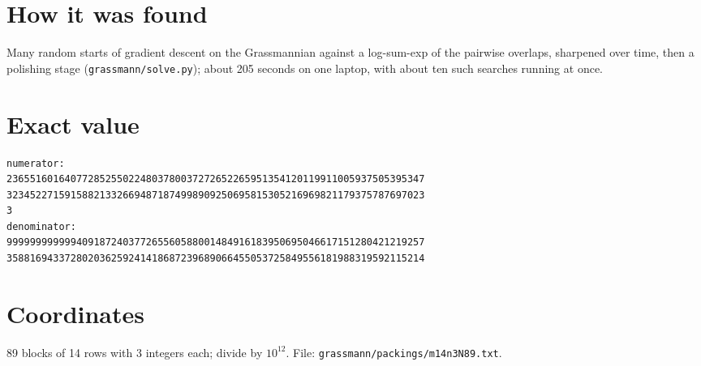 \documentclass[11pt,a4paper]{article}
\begin{document}
\section{How it was found}
Many random starts of gradient descent on the Grassmannian against a log-sum-exp of the pairwise overlaps, sharpened over time, then a polishing stage (\texttt{grassmann/solve.py}); about 205 seconds on one laptop, with about ten such searches running at once.


\appendix
\section{Exact value}
{\small
\begin{verbatim}
numerator:
236551601640772852550224803780037272652265951354120119911005937505395347
323452271591588213326694871874998909250695815305216969821179375787697023
3
denominator:
999999999999409187240377265560588001484916183950695046617151280421219257
358816943372802036259241418687239689066455053725849556181988319592115214
\end{verbatim}}

\section{Coordinates}
89 blocks of 14 rows with 3 integers each; divide by $10^{12}$. File: \texttt{grassmann/packings/m14n3N89.txt}.
{\tiny
\begin{multicols}{3}
\end{multicols}}
\end{document}

